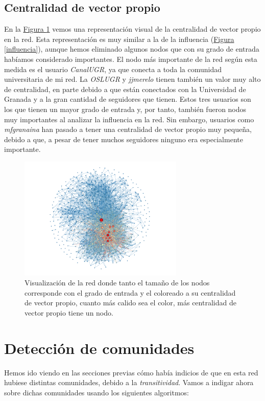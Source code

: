 \documentclass[10pt,a4paper,spanish]{article}
\numberwithin{equation}{section} %
\numberwithin{figure}{section} %
\numberwithin{table}{section} %
\begin{document}
\subsection{Centralidad de vector propio}
En la \hyperref[evv]{Figura \ref*{evv}} vemos una representación visual de la centralidad de vector propio en la red. Esta representación es muy similar a la de la influencia (\hyperref[influencia]{Figura \ref*{influencia}}), aunque hemos eliminado algunos nodos que con su grado de entrada habíamos considerado importantes. El nodo más importante de la red según esta medida es el usuario \textit{CanalUGR}, ya que conecta a toda la comunidad universitaria de mi red. La \textit{OSLUGR} y \textit{jjmerelo} tienen también un valor muy alto de centralidad, en parte debido a que están conectados con la Universidad de Granada y a la gran cantidad de seguidores que tienen. Estos tres usuarios son los que tienen un mayor grado de entrada y, por tanto, también fueron nodos muy importantes al analizar la influencia en la red. Sin embargo, usuarios como \textit{mfgranaina} han pasado a tener una centralidad de vector propio muy pequeña, debido a que, a pesar de tener muchos seguidores ninguno era especialmente importante.

\begin{figure}[!h]
    \centering
    \includegraphics[width=0.7\textwidth]{medidas_locales/eigenvector}
    \caption{Visualización de la red donde tanto el tamaño de los nodos corresponde con el grado de entrada y el coloreado a su centralidad de vector propio, cuanto más calido sea el color, más centralidad de vector propio tiene un nodo.}
    \label{evv}
\end{figure}

\section{Detección de comunidades}
Hemos ido viendo en las secciones previas cómo había indicios de que en esta red hubiese distintas comunidades, debido a la \textit{transitividad}. Vamos a indigar ahora sobre dichas comunidades usando los siguientes algoritmos:
\end{document}
